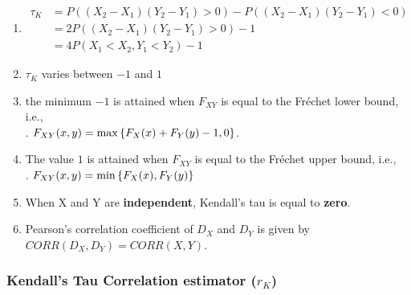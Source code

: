 \begin{enumerate}
    \item 
    $
        \begin{aligned}
            \tau_K 
            & = P((X_2 - X_1)(Y_2 - Y_1) > 0) - P((X_2 - X_1)(Y_2 - Y_1) < 0) \\
            &= 2 P((X_2 - X_1)(Y_2 - Y_1) > 0) - 1 \\
            &= 4 P(X_1 < X_2, Y_1 < Y_2) - 1
        \end{aligned}
    $
    \hfill \cite{statistics/book/Statistics-for-Data-Scientists/Maurits-Kaptein}

    \item $\tau_K$ varies between $-1$ and $1$
    \hfill \cite{statistics/book/Statistics-for-Data-Scientists/Maurits-Kaptein}

    \item the minimum $-1$ is attained when $F_{X Y}$ is equal to the Fréchet lower bound, i.e.,
    \hfill \cite{statistics/book/Statistics-for-Data-Scientists/Maurits-Kaptein}
    \\
    .\hfill
    $F _{X Y} (x, y) = \max\left\{F_X (x) + F_Y (y) - 1, 0\right\}$.
    \hfill \cite{statistics/book/Statistics-for-Data-Scientists/Maurits-Kaptein}

    \item The value $1$ is attained when $F_{X Y}$ is equal to the Fréchet upper bound, i.e., 
    \hfill \cite{statistics/book/Statistics-for-Data-Scientists/Maurits-Kaptein}
    \\
    .\hfill
    $F_{X Y} (x, y) = \min\left\{F_X (x), F_Y (y)\right\}$
    \hfill \cite{statistics/book/Statistics-for-Data-Scientists/Maurits-Kaptein}

    \item When X and Y are \textbf{independent}, Kendall’s tau is equal to \textbf{zero}.
    \hfill \cite{statistics/book/Statistics-for-Data-Scientists/Maurits-Kaptein}

    \item Pearson’s correlation coefficient of $D_X$ and $D_Y$ is given by $CORR(D_X , D_Y ) = CORR(X, Y )$.
    \hfill \cite{statistics/book/Statistics-for-Data-Scientists/Maurits-Kaptein}

\end{enumerate}




\subsubsection{Kendall’s Tau Correlation estimator ($r_K$)}

